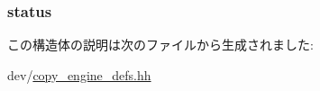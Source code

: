 \label{structCopyEngineReg_1_1ChanRegs_abee0af905168a3f0b6f2e6683668d301}
\hypertarget{structCopyEngineReg_1_1ChanRegs_af278ef315e7598554b97bb8000dee843}{
\subsubsection[{status}]{ {\bf status}}}
\label{structCopyEngineReg_1_1ChanRegs_af278ef315e7598554b97bb8000dee843}


この構造体の説明は次のファイルから生成されました:\begin{DoxyCompactItemize}
\item 
dev/\hyperlink{copy__engine__defs_8hh}{copy\_\-engine\_\-defs.hh}\end{DoxyCompactItemize}
